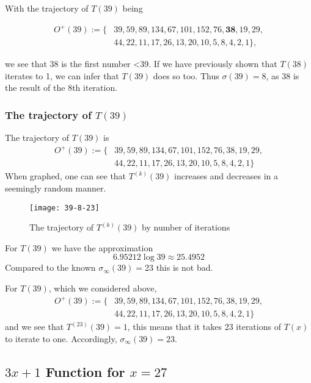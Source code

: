 \documentclass[12pt,a4paper,reqno]{amsart}
\begin{document}
With the trajectory of $T(39)$ being

\begin{align}
    \nonumber
    O^+(39):=\{&39,59,89,134,67,101,152,76,\textbf{38},19,29,\\
    \nonumber
               &44,22,11,17,26,13,20,10,5,8,4,2,1\},
\end{align}

we see that 38 is the first number <39. If we have previously shown that
$T(38)$ iterates to 1, we can infer that $T(39)$ does so too. Thus 
$\sigma(39) = 8$, as 38 is the result of the 8th iteration.
\subsubsection{The trajectory of $T(39)$}

The trajectory of $T(39)$ is
\begin{align}
    \nonumber
    O^+(39):=\{&39,59,89,134,67,101,152,76,38,19,29,\\
    \nonumber
               &44,22,11,17,26,13,20,10,5,8,4,2,1\}
\end{align}
When graphed, one can see that $T^{(k)}(39)$ increases and decreases in
a seemingly random manner.
\begin{figure}[h]
\texttt{[image: 39-8-23]}
    \caption{The trajectory of $T^{(k)}(39)$ by number of iterations}
\label{fig:01}
\end{figure}

For $T(39)$ we have the approximation
\begin{equation}\nonumber
    6.95212 \log 39 \approx 25.4952
\end{equation}
Compared to the known $\sigma_{\infty}(39)=23$ this is not bad.

For $T(39)$, which we considered above, 
\begin{align}
    \nonumber
    O^+(39):=\{&39,59,89,134,67,101,152,76,38,19,29,\\
    \nonumber
               &44,22,11,17,26,13,20,10,5,8,4,2,1\}
\end{align}
and we see that $T^{(23)}(39)=1$, this means that it takes 23 iterations of
$T(x)$ to iterate to one. Accordingly, $\sigma_{\infty}(39)=23$.

\subsection{$3x+1$ Function for $x=27$}
\end{document}
